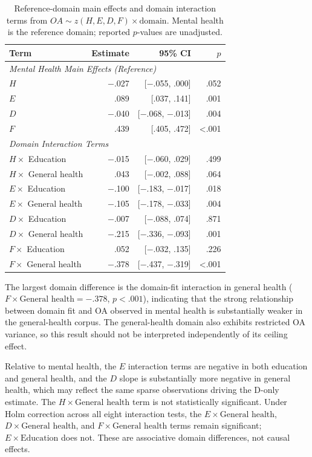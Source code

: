 \documentclass[manuscript,review,anonymous]{acmart}
\begin{document}
\begin{table}[t]
\centering
\small
\caption{Reference-domain main effects and domain interaction terms from $OA\sim z(H,E,D,F)\times\text{domain}$. Mental health is the reference domain; reported $p$-values are unadjusted.}
\label{tab:interactions}
\begin{tabular}{lrrr}
\toprule
Term & Estimate & 95\% CI & $p$\\
\midrule
\multicolumn{4}{l}{\textit{Mental Health Main Effects (Reference)}} \\
$H$ & $-$.027 & [$-$.055, .000] & .052 \\
$E$ & .089 & [.037, .141] & .001 \\
$D$ & $-$.040 & [$-$.068, $-$.013] & .004 \\
$F$ & .439 & [.405, .472] & <.001 \\
\midrule
\multicolumn{4}{l}{\textit{Domain Interaction Terms}} \\
$H\times$ Education & $-$.015 & [$-$.060, .029] & .499\\
$H\times$ General health & .043 & [$-$.002, .088] & .064\\
$E\times$ Education & $-$.100 & [$-$.183, $-$.017] & .018\\
$E\times$ General health & $-$.105 & [$-$.178, $-$.033] & .004\\
$D\times$ Education & $-$.007 & [$-$.088, .074] & .871\\
$D\times$ General health & $-$.215 & [$-$.336, $-$.093] & .001\\
$F\times$ Education & .052 & [$-$.032, .135] & .226\\
$F\times$ General health & $-$.378 & [$-$.437, $-$.319] & <.001\\
\bottomrule
\end{tabular}
\end{table}
The largest domain difference is the domain-fit interaction in general health ($F\times\text{General health}=-.378$, $p<.001$), indicating that the strong relationship between domain fit and OA observed in mental health is substantially weaker in the general-health corpus. The general-health domain also exhibits restricted OA variance, so this result should not be interpreted independently of its ceiling effect.

Relative to mental health, the $E$ interaction terms are negative in both education and general health, and the $D$ slope is substantially more negative in general health, which may reflect the same sparse observations driving the D-only estimate. The $H\times\text{General health}$ term is not statistically significant. Under Holm correction across all eight interaction tests, the $E\times\text{General health}$, $D\times\text{General health}$, and $F\times\text{General health}$ terms remain significant; $E\times\text{Education}$ does not. These are associative domain differences, not causal effects.
\end{document}
